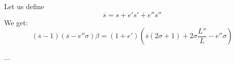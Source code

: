 \documentclass{article}
\begin{document}
Let us define
\begin{equation}
\overline{s} = s + e's' + e''s''
\end{equation}
We get:
\begin{equation}
(\overline{s} - 1)(\overline{s} - e''\sigma)\beta
= (1 + e')(\overline{s}(2\sigma + 1) + 2\sigma \frac{L''}{L}
  - e''\sigma)
\end{equation}

...
\end{document}
